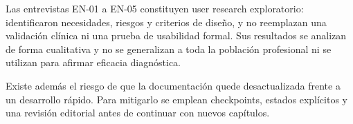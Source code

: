 Las entrevistas EN-01 a EN-05 constituyen user research exploratorio: identificaron necesidades, riesgos y criterios de diseño, y no reemplazan una validación clínica ni una prueba de usabilidad formal. Sus resultados se analizan de forma cualitativa y no se generalizan a toda la población profesional ni se utilizan para afirmar eficacia diagnóstica.

Existe además el riesgo de que la documentación quede desactualizada frente a un desarrollo rápido. Para mitigarlo se emplean checkpoints, estados explícitos y una revisión editorial antes de continuar con nuevos capítulos.
